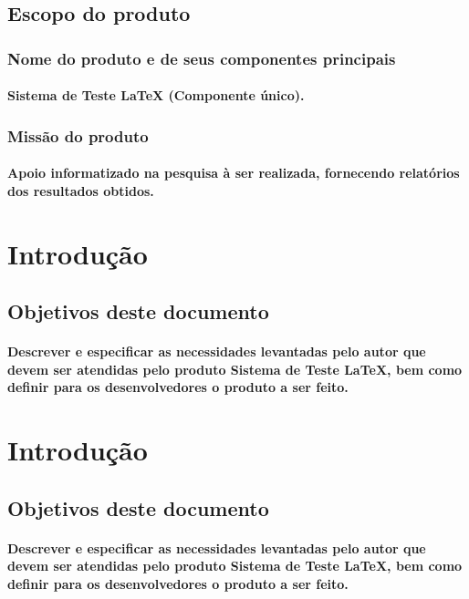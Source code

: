 \documentclass{article}
\begin{document}
	\subsection{Escopo do produto}
		\subsubsection{Nome do produto e de seus componentes principais}
			\paragraph{Sistema de Teste LaTeX (Componente único). }
		\subsubsection{Missão do produto}
			\paragraph{Apoio informatizado na pesquisa à ser realizada, fornecendo relatórios dos resultados obtidos.}
			
	
\newpage

\section{Introdução}
	\subsection{Objetivos deste documento}
		\paragraph{Descrever e especificar as necessidades levantadas pelo autor que devem ser atendidas pelo produto Sistema de Teste LaTeX, bem como definir para os desenvolvedores o produto a ser feito.}

\newpage

\section{Introdução}
	\subsection{Objetivos deste documento}
		\paragraph{Descrever e especificar as necessidades levantadas pelo autor que devem ser atendidas pelo produto Sistema de Teste LaTeX, bem como definir para os desenvolvedores o produto a ser feito.}
\end{document}
